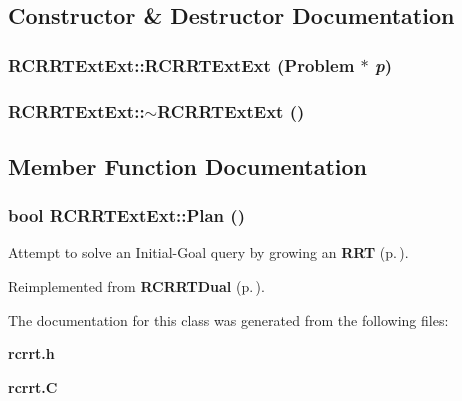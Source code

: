 \subsection{Constructor \& Destructor Documentation}
\subsubsection{\setlength{\rightskip}{0pt plus 5cm}RCRRTExt\-Ext::RCRRTExt\-Ext ({\bf Problem} $\ast$ {\em p})}\label{classRCRRTExtExt_a0}


\subsubsection{\setlength{\rightskip}{0pt plus 5cm}RCRRTExt\-Ext::$\sim$RCRRTExt\-Ext ()\hspace{0.3cm}{\tt  [inline, virtual]}}\label{classRCRRTExtExt_a1}




\subsection{Member Function Documentation}
\subsubsection{\setlength{\rightskip}{0pt plus 5cm}bool RCRRTExt\-Ext::Plan ()\hspace{0.3cm}{\tt  [virtual]}}\label{classRCRRTExtExt_a2}


Attempt to solve an Initial-Goal query by growing an {\bf RRT} {\rm (p.\,\pageref{classRRT})}.



Reimplemented from {\bf RCRRTDual} {\rm (p.\,\pageref{classRCRRTDual_a2})}.

The documentation for this class was generated from the following files:\begin{CompactItemize}
\item 
{\bf rcrrt.h}\item 
{\bf rcrrt.C}\end{CompactItemize}
